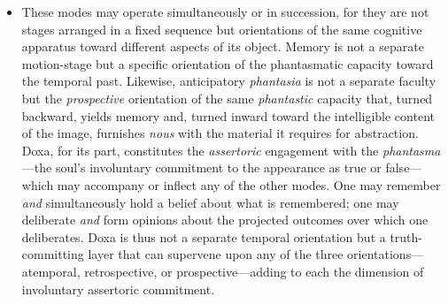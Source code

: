 \begin{itemize}
\begin{itemize}
\begin{itemize}
              \item These modes may operate simultaneously or in succession, for they
              are not stages arranged in a fixed sequence but orientations of the same
              cognitive apparatus toward different aspects of its object. Memory is not
              a separate motion-stage but a specific orientation of the phantasmatic
              capacity toward the temporal past. Likewise, anticipatory
              \textit{phantasia} is not a separate faculty but the
              \textit{prospective} orientation of the same \textit{phantastic}
              capacity that, turned backward, yields memory and, turned inward toward
              the intelligible content of the image, furnishes \textit{nous} with the
              material it requires for abstraction. Doxa, for its part, constitutes the
              \textit{assertoric} engagement with the \textit{phantasma}---the soul's
              involuntary commitment to the appearance as true or false---which may
              accompany or inflect any of the other modes. One may remember \textit{and}
              simultaneously hold a belief about what is remembered; one may deliberate
              \textit{and} form opinions about the projected outcomes over which one
              deliberates. Doxa is thus not a separate temporal orientation but a
              truth-committing layer that can supervene upon any of the three
              orientations---atemporal, retrospective, or prospective---adding to each
              the dimension of involuntary assertoric commitment.


\end{itemize}
\end{itemize}
\end{itemize}
